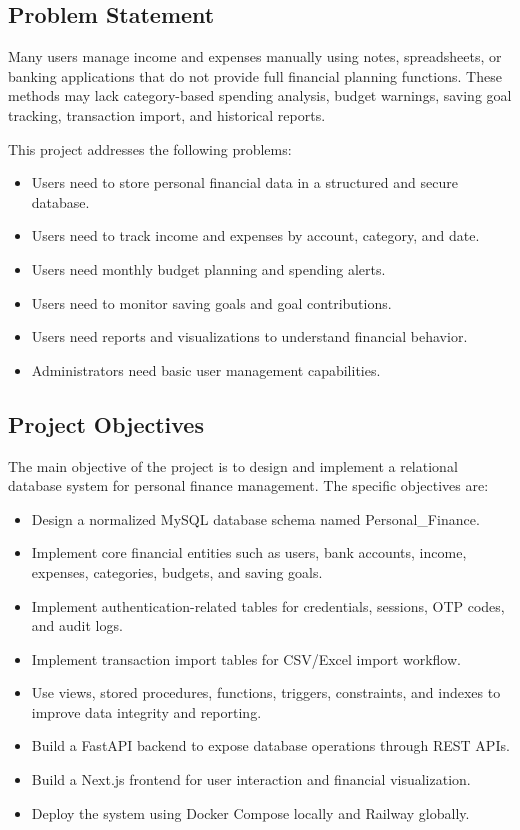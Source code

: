 \documentclass{article}
\newcommand{\dbname}{Personal\_Finance}
\begin{document}
\subsection{Problem Statement}
Many users manage income and expenses manually using notes, spreadsheets, or banking applications that do not provide full financial planning functions. These methods may lack category-based spending analysis, budget warnings, saving goal tracking, transaction import, and historical reports.

This project addresses the following problems:
\begin{itemize}
    \item Users need to store personal financial data in a structured and secure database.
    \item Users need to track income and expenses by account, category, and date.
    \item Users need monthly budget planning and spending alerts.
    \item Users need to monitor saving goals and goal contributions.
    \item Users need reports and visualizations to understand financial behavior.
    \item Administrators need basic user management capabilities.
\end{itemize}

\subsection{Project Objectives}
The main objective of the project is to design and implement a relational database system for personal finance management. The specific objectives are:
\begin{itemize}
    \item Design a normalized MySQL database schema named \dbname.
    \item Implement core financial entities such as users, bank accounts, income, expenses, categories, budgets, and saving goals.
    \item Implement authentication-related tables for credentials, sessions, OTP codes, and audit logs.
    \item Implement transaction import tables for CSV/Excel import workflow.
    \item Use views, stored procedures, functions, triggers, constraints, and indexes to improve data integrity and reporting.
    \item Build a FastAPI backend to expose database operations through REST APIs.
    \item Build a Next.js frontend for user interaction and financial visualization.
    \item Deploy the system using Docker Compose locally and Railway globally.
\end{itemize}
\end{document}

